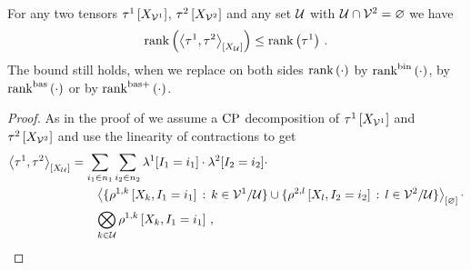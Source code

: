 \begin{lemma}
    \label{lem:sparsityDisjointContraction}
    For any two tensors $\tau^{1}\left[X_{\mathcal{V}^{1}}\right]$, $\tau^{2}\left[X_{\mathcal{V}^{2}}\right]$ and any set $\mathcal{U}$ with $\mathcal{U}\cap\mathcal{V}^{2}=\varnothing$ we have
    \begin{align*}
        \mathrm{rank}\left(\left\langle \tau^{1},\tau^{2}\right\rangle_{\left[ X_{\mathcal{U}} \right]}\right) \leq \mathrm{rank}\left(\tau^{1}\right) \, .
    \end{align*}
    The bound still holds, when we replace on both sides $\mathrm{rank}\left(\cdot\right)$ by $\mathrm{rank}^{\mathrm{bin}}\left(\cdot\right)$, by $\mathrm{rank}^{\mathrm{bas}}\left(\cdot\right)$ or by $\mathrm{rank}^{\mathrm{bas+}}\left(\cdot\right)$.
\end{lemma}
\begin{proof}
    As in the proof of  we assume a $\mathrm{CP}$ decomposition of $\tau^{1}\left[X_{\mathcal{V}^{1}}\right]$ and $\tau^{2}\left[X_{\mathcal{V}^{2}}\right]$ and use the linearity of contractions to get
    \begin{align*}
        \left\langle \tau^{1},\tau^{2}\right\rangle_{\left[ X_{\mathcal{U}} \right]}
        &= \sum_{i_{1}\in n_{1}} \sum_{i_{2}\in n_{2}}
        \lambda^{1}[I_{1}=i_{1}] \cdot \lambda^{2}[I_{2}=i_{2}] \cdot \\
        & \quad\quad \left\langle \{\rho^{1,k}\left[X_{k},I_{1}=i_{1}\right] \,:\, k\in\mathcal{V}^{1}/\mathcal{U}\} \cup \{\rho^{2,l}\left[X_{l},I_{2}=i_{2}\right] \,:\, l\in\mathcal{V}^{2}/\mathcal{U}\}\right\rangle_{\left[ \varnothing \right]} \cdot \\
        & \quad\quad \bigotimes_{k\in\mathcal{U}} \rho^{1,k}\left[X_{k},I_{1}=i_{1}\right] \, ,
    \end{align*}

\end{proof}

